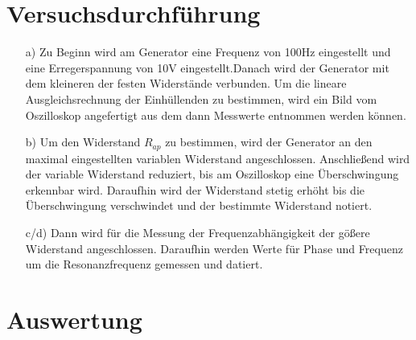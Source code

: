 
\section{Versuchsdurchführung}\justifying

 \begin{enumerate}

    \item[a)] \justifying Zu Beginn wird am Generator eine Frequenz von 100Hz 
    eingestellt und eine Erregerspannung von 10V eingestellt.Danach wird der 
    Generator mit dem kleineren der festen Widerstände verbunden.
    Um die lineare Ausgleichsrechnung der Einhüllenden zu bestimmen, wird
    ein Bild vom Oszilloskop angefertigt aus dem dann Messwerte entnommen werden
    können.

    \item[b)] \justifying Um den Widerstand $R_{ap}$ zu bestimmen, wird der Generator 
    an den maximal eingestellten variablen Widerstand angeschlossen. Anschließend wird 
    der variable Widerstand reduziert, bis am Oszilloskop eine Überschwingung erkennbar 
    wird. Daraufhin wird der Widerstand stetig erhöht bis die Überschwingung verschwindet 
    und der bestimmte Widerstand notiert.
  
    \item[c/d)] \justifying Dann wird für die Messung der Frequenzabhängigkeit
                          der gößere Widerstand angeschlossen.
                          Daraufhin werden Werte für Phase und Frequenz um die 
                          Resonanzfrequenz gemessen und datiert.
  
    

  \end{enumerate}


\section{Auswertung}\justifying


